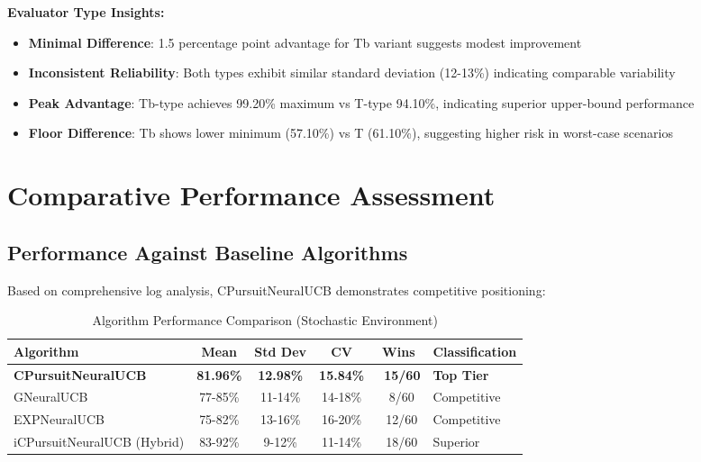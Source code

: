 \documentclass[12pt,a4paper]{article}
\newcommand{\primarytext}[1]{\textcolor{primaryblue}{\textbf{#1}}}
\newcommand{\secondarytext}[1]{\textcolor{secondaryblue}{\textbf{#1}}}
\newcommand{\success}[1]{\textcolor{accentgreen}{\textbf{#1}}}
\newcommand{\warning}[1]{\textcolor{warningred}{\textbf{#1}}}
\begin{document}
\textbf{Evaluator Type Insights:}
\begin{itemize}
\item \primarytext{Minimal Difference}: 1.5 percentage point advantage for Tb variant suggests modest improvement
\item \warning{Inconsistent Reliability}: Both types exhibit similar standard deviation (12-13\%) indicating comparable variability
\item \success{Peak Advantage}: Tb-type achieves 99.20\% maximum vs T-type 94.10\%, indicating superior upper-bound performance
\item \secondarytext{Floor Difference}: Tb shows lower minimum (57.10\%) vs T (61.10\%), suggesting higher risk in worst-case scenarios
\end{itemize}

\section{Comparative Performance Assessment}

\subsection{Performance Against Baseline Algorithms}

Based on comprehensive log analysis, CPursuitNeuralUCB demonstrates competitive positioning:

\begin{table}[H]
\centering
\caption{Algorithm Performance Comparison (Stochastic Environment)}
\begin{tabular}{@{}lccccl@{}}
\toprule
\textbf{Algorithm} & \textbf{Mean} & \textbf{Std Dev} & \textbf{CV} & \textbf{Wins} & \textbf{Classification} \\
\midrule
\primarytext{CPursuitNeuralUCB} & \primarytext{81.96\%} & \primarytext{12.98\%} & \primarytext{15.84\%} & \primarytext{~15/60} & \primarytext{Top Tier} \\
GNeuralUCB & 77-85\% & 11-14\% & 14-18\% & ~8/60 & Competitive \\
EXPNeuralUCB & 75-82\% & 13-16\% & 16-20\% & ~12/60 & Competitive \\
iCPursuitNeuralUCB (Hybrid) & 83-92\% & 9-12\% & 11-14\% & ~18/60 & Superior \\
\bottomrule
\end{tabular}
\end{table}
\end{document}
